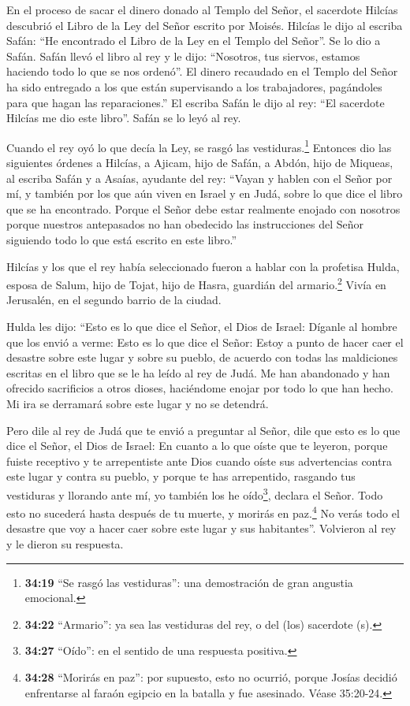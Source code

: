  En el proceso de sacar el dinero donado al Templo del
Señor, el sacerdote Hilcías descubrió el Libro de la Ley del Señor
escrito por Moisés.  Hilcías le dijo al escriba Safán: ``He
encontrado el Libro de la Ley en el Templo del Señor''. Se lo dio a
Safán.  Safán llevó el libro al rey y le dijo: ``Nosotros,
tus siervos, estamos haciendo todo lo que se nos ordenó''. 
El dinero recaudado en el Templo del Señor ha sido entregado a los que
están supervisando a los trabajadores, pagándoles para que hagan las
reparaciones.''  El escriba Safán le dijo al rey: ``El
sacerdote Hilcías me dio este libro''. Safán se lo leyó al rey.

 Cuando el rey oyó lo que decía la Ley, se rasgó las
vestiduras.\footnote{\textbf{34:19} ``Se rasgó las vestiduras'': una
  demostración de gran angustia emocional.}  Entonces dio
las siguientes órdenes a Hilcías, a Ajicam, hijo de Safán, a Abdón, hijo
de Miqueas, al escriba Safán y a Asaías, ayudante del rey: 
``Vayan y hablen con el Señor por mí, y también por los que aún viven en
Israel y en Judá, sobre lo que dice el libro que se ha encontrado.
Porque el Señor debe estar realmente enojado con nosotros porque
nuestros antepasados no han obedecido las instrucciones del Señor
siguiendo todo lo que está escrito en este libro.''

 Hilcías y los que el rey había seleccionado fueron a
hablar con la profetisa Hulda, esposa de Salum, hijo de Tojat, hijo de
Hasra, guardián del armario.\footnote{\textbf{34:22} ``Armario'': ya sea
  las vestiduras del rey, o del (los) sacerdote (s).} Vivía en
Jerusalén, en el segundo barrio de la ciudad.

 Hulda les dijo: ``Esto es lo que dice el Señor, el Dios de
Israel: Díganle al hombre que los envió a verme:  Esto es
lo que dice el Señor: Estoy a punto de hacer caer el desastre sobre este
lugar y sobre su pueblo, de acuerdo con todas las maldiciones escritas
en el libro que se le ha leído al rey de Judá.  Me han
abandonado y han ofrecido sacrificios a otros dioses, haciéndome enojar
por todo lo que han hecho. Mi ira se derramará sobre este lugar y no se
detendrá.

 Pero dile al rey de Judá que te envió a preguntar al
Señor, dile que esto es lo que dice el Señor, el Dios de Israel: En
cuanto a lo que oíste que te leyeron,  porque fuiste
receptivo y te arrepentiste ante Dios cuando oíste sus advertencias
contra este lugar y contra su pueblo, y porque te has arrepentido,
rasgando tus vestiduras y llorando ante mí, yo también los he
oído\footnote{\textbf{34:27} ``Oído'': en el sentido de una respuesta
  positiva.}, declara el Señor.  Todo esto no sucederá
hasta después de tu muerte, y morirás en paz.\footnote{\textbf{34:28}
  ``Morirás en paz'': por supuesto, esto no ocurrió, porque Josías
  decidió enfrentarse al faraón egipcio en la batalla y fue asesinado.
  Véase 35:20-24.} No verás todo el desastre que voy a hacer caer sobre
este lugar y sus habitantes''. Volvieron al rey y le dieron su
respuesta.

